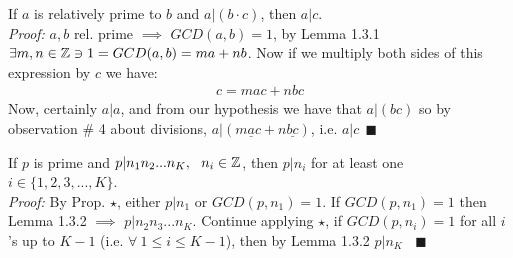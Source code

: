 
\begin{lemma}
If $a$ is relatively prime to $b$ and $a|(b\cdot c)$, then $a|c$. \\
\textit{Proof:} $a,b$ rel. prime $\implies$ $GCD(a,b)=1$, by Lemma 1.3.1
$\exists m,n \in {\mathbb{Z}} \ni 1= GCD(a,b)=ma+nb$. Now if we multiply both sides of this expression by $c$
we have:
\begin{align}
    c=mac+nbc\nonumber
\end{align}
Now, certainly $a|a$, and from our hypothesis we have that $a|(bc)$ so by observation \# 4 about
divisions, $a|(m\underline{a}c+ n\underline{bc})$, i.e. $a|c \ \ \blacksquare$ \steezybreak

\end{lemma}

\noindent \setcounter{dummy_lemma}{1}
\begin{corollary}
If $p$ is prime and $p|n_1n_2...n_K,\ \ n_i\in {\mathbb{Z}}$, then $p|n_i$ for at least one
$i \in \{1,2,3,...,K\}$.\\
\textit{Proof:} By Prop. $\star$, either $p|n_1$ or $GCD(p,n_1)=1$. If $GCD(p,n_1)=1$ then Lemma
1.3.2 $\implies$ $p|n_2n_3...n_K$. Continue applying $\star$, if $GCD(p,n_i)=1$ for all $i$'s up to
$K-1$ (i.e. $\forall \ 1\leq i\leq K-1$), then by Lemma 1.3.2 $p|n_K\ \ \ \ \blacksquare$
\end{corollary}

